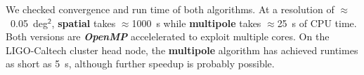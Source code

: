 \documentclass[landscape]{a0poster}
\renewcommand{\emph}[1]{{\bfseries\itshape#1}}
\begin{document}
\noindent
We checked convergence and run time of both algorithms.  At a resolution of $\approx$~0.05~deg$^\mathsf{2}$, \textbf{spatial} takes $\approx$1000~s while \textbf{multipole} takes $\approx$25~s of CPU time.  Both versions are \emph{OpenMP} accelelerated to exploit multiple cores.  On the LIGO-Caltech cluster head node, the \textbf{multipole} algorithm has achieved runtimes as short as 5~s, although further speedup is probably possible.

\vspace{1cm}
\end{document}
